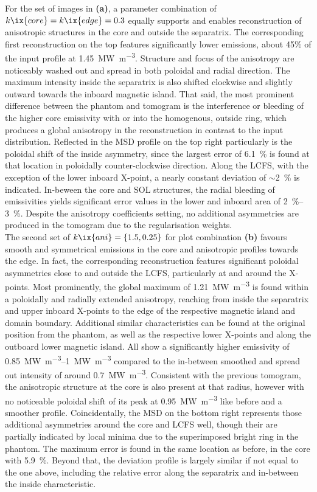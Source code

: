                 For the set of images in \textbf{(a)}, a parameter combination of $k\ix{core}=k\ix{edge}=0.3$ equally supports and enables reconstruction of anisotropic structures in the core and outside the separatrix. The corresponding first reconstruction on the top features significantly lower emissions, about 45\% of the input profile at \SI{1.45}{\mega\watt\per\cubic\meter}. Structure and focus of the anisotropy are noticeably washed out and spread in both poloidal and radial direction. The maximum intensity inside the separatrix is also shifted clockwise and slightly outward towards the inboard magnetic island. That said, the most prominent difference between the phantom and tomogram is the interference or bleeding of the higher core emissivity with or into the homogenous, outside ring, which produces a global anisotropy in the reconstruction in contrast to the input distribution. Reflected in the MSD profile on the top right particularly is the poloidal shift of the inside asymmetry, since the largest error of \SI{6.1}{\percent} is found at that location in poloidally counter-clockwise direction. Along the LCFS, with the exception of the lower inboard X-point, a nearly constant deviation of $\sim$\SI{2}{\percent} is indicated. In-beween the core and SOL structures, the radial bleeding of emissivities yields significant error values in the lower and inboard area of \SIrange{2}{3}{\percent}. Despite the anisotropy coefficients setting, no additional asymmetries are produced in the tomogram due to the regularisation weights.\\%
                The second set of $k\ix{ani}=\left\{1.5, 0.25\right\}$ for plot combination \textbf{(b)} favours smooth and symmetrical emissions in the core and anisotropic profiles towards the edge. In fact, the corresponding reconstruction features significant poloidal asymmetries close to and outside the LCFS, particularly at and around the X-points. Most prominently, the global maximum of \SI{1.21}{\mega\watt\per\cubic\meter} is found within a poloidally and radially extended anisotropy, reaching from inside the separatrix and upper inboard X-points to the edge of the respective magnetic island and domain boundary. Additional similar characteristics can be found at the original position from the phantom, as well as the respective lower X-points and along the outboard lower magnetic island. All show a significantly higher emissivity of \SIrange{0.85}{1}{\mega\watt\per\cubic\meter} compared to the in-between smoothed and spread out intensity of around \SI{0.7}{\mega\watt\per\cubic\meter}. Consistent with the previous tomogram, the anisotropic structure at the core is also present at that radius, however with no noticeable poloidal shift of its peak at \SI{0.95}{\mega\watt\per\cubic\meter} like before and a smoother profile. Coincidentally, the MSD on the bottom right represents those additional asymmetries around the core and LCFS well, though their are partially indicated by local minima due to the superimposed bright ring in the phantom. The maximum error is found in the same location as before, in the core with \SI{5.9}{\percent}. Beyond that, the deviation profile is largely similar if not equal to the one above, including the relative error along the separatrix and in-between the inside characteristic.\\%
